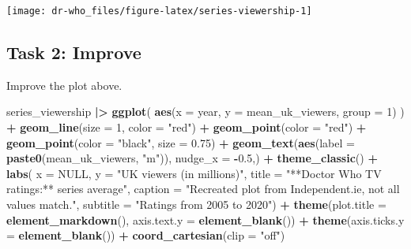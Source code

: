 \documentclass[
]{article}
\newenvironment{Shaded}{\begin{snugshade}}{\end{snugshade}}
\newcommand{\AttributeTok}[1]{\textcolor[rgb]{0.13,0.29,0.53}{#1}}
\newcommand{\ConstantTok}[1]{\textcolor[rgb]{0.56,0.35,0.01}{#1}}
\newcommand{\DecValTok}[1]{\textcolor[rgb]{0.00,0.00,0.81}{#1}}
\newcommand{\FloatTok}[1]{\textcolor[rgb]{0.00,0.00,0.81}{#1}}
\newcommand{\FunctionTok}[1]{\textcolor[rgb]{0.13,0.29,0.53}{\textbf{#1}}}
\newcommand{\NormalTok}[1]{#1}
\newcommand{\SpecialCharTok}[1]{\textcolor[rgb]{0.81,0.36,0.00}{\textbf{#1}}}
\newcommand{\StringTok}[1]{\textcolor[rgb]{0.31,0.60,0.02}{#1}}
\begin{document}
\texttt{[image: dr-who\_files/figure-latex/series-viewership-1]}

\hypertarget{task-2-improve}{%
\subsection{Task 2: Improve}\label{task-2-improve}}

Improve the plot above.

\begin{Shaded}
\begin{Highlighting}[]
\NormalTok{series\_viewership }\SpecialCharTok{|\textgreater{}}
  \FunctionTok{ggplot}\NormalTok{(}
    \FunctionTok{aes}\NormalTok{(}\AttributeTok{x =}\NormalTok{ year, }\AttributeTok{y =}\NormalTok{ mean\_uk\_viewers, }\AttributeTok{group =} \DecValTok{1}\NormalTok{)}
\NormalTok{    ) }\SpecialCharTok{+} 
  \FunctionTok{geom\_line}\NormalTok{(}\AttributeTok{size =} \DecValTok{1}\NormalTok{, }\AttributeTok{color =} \StringTok{"red"}\NormalTok{) }\SpecialCharTok{+} 
  \FunctionTok{geom\_point}\NormalTok{(}\AttributeTok{color =} \StringTok{"red"}\NormalTok{) }\SpecialCharTok{+} 
  \FunctionTok{geom\_point}\NormalTok{(}\AttributeTok{color =} \StringTok{"black"}\NormalTok{, }\AttributeTok{size =} \FloatTok{0.75}\NormalTok{) }\SpecialCharTok{+} 
  \FunctionTok{geom\_text}\NormalTok{(}\FunctionTok{aes}\NormalTok{(}\AttributeTok{label =} \FunctionTok{paste0}\NormalTok{(mean\_uk\_viewers, }\StringTok{"m"}\NormalTok{)), }\AttributeTok{nudge\_x =} \SpecialCharTok{{-}}\FloatTok{0.5}\NormalTok{,) }\SpecialCharTok{+}
  \FunctionTok{theme\_classic}\NormalTok{() }\SpecialCharTok{+} 
   \FunctionTok{labs}\NormalTok{(}
     \AttributeTok{x =} \ConstantTok{NULL}\NormalTok{, }
     \AttributeTok{y =} \StringTok{"UK viewers (in millions)"}\NormalTok{,}
    \AttributeTok{title =} \StringTok{"**Doctor Who TV ratings:** series average"}\NormalTok{, }
    \AttributeTok{caption =} \StringTok{"Recreated plot from Independent.ie, not all values match."}\NormalTok{,}
    \AttributeTok{subtitle =} \StringTok{"Ratings from 2005 to 2020"}\NormalTok{) }\SpecialCharTok{+} 
    \FunctionTok{theme}\NormalTok{(}\AttributeTok{plot.title =} \FunctionTok{element\_markdown}\NormalTok{(), }
           \AttributeTok{axis.text.y =} \FunctionTok{element\_blank}\NormalTok{()) }\SpecialCharTok{+}
    \FunctionTok{theme}\NormalTok{(}\AttributeTok{axis.ticks.y =} \FunctionTok{element\_blank}\NormalTok{()) }\SpecialCharTok{+}
   \FunctionTok{coord\_cartesian}\NormalTok{(}\AttributeTok{clip =} \StringTok{"off"}\NormalTok{)}
\end{Highlighting}
\end{Shaded}
\end{document}
